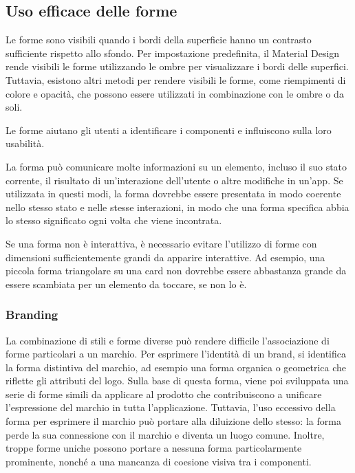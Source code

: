 \documentclass[12pt, a4paper]{report}
\begin{document}
	\subsection{Uso efficace delle forme}
	Le forme sono visibili quando i bordi della superficie hanno un contrasto sufficiente rispetto allo sfondo. Per impostazione predefinita, il Material Design rende visibili le forme utilizzando le ombre per visualizzare i bordi delle superfici.
	Tuttavia, esistono altri metodi per rendere visibili le forme, come riempimenti di colore e opacità, che possono essere utilizzati in combinazione con le ombre o da soli.

	Le forme aiutano gli utenti a identificare i componenti e influiscono sulla loro usabilità.

	La forma può comunicare molte informazioni su un elemento, incluso il suo stato corrente, il risultato di un'interazione dell'utente o altre modifiche in un'app. Se utilizzata in questi modi, la forma dovrebbe essere presentata in modo coerente
	nello stesso stato e nelle stesse interazioni, in modo che una forma specifica abbia lo stesso significato ogni volta che viene incontrata.

	Se una forma non è interattiva, è necessario evitare l'utilizzo di forme con dimensioni sufficientemente grandi da apparire interattive. Ad esempio, una piccola forma triangolare su una card non dovrebbe essere abbastanza grande da essere scambiata per un elemento da toccare, se non lo è.

	\subsubsection{Branding}
	La combinazione di stili e forme diverse può rendere difficile l'associazione di forme particolari a un marchio. Per esprimere l'identità di un brand, si identifica la forma distintiva del marchio, ad esempio una forma organica o geometrica che riflette
	gli attributi del logo. Sulla base di questa forma,  viene poi sviluppata una serie di forme simili da applicare al prodotto che contribuiscono a unificare l'espressione del marchio in tutta l'applicazione. Tuttavia, l'uso eccessivo della forma per esprimere il marchio può portare
	alla diluizione dello stesso: la forma perde la sua connessione con il marchio e diventa un luogo comune. Inoltre, troppe forme uniche possono portare a nessuna forma particolarmente prominente, nonché a una mancanza di coesione visiva tra i componenti.
\end{document}

